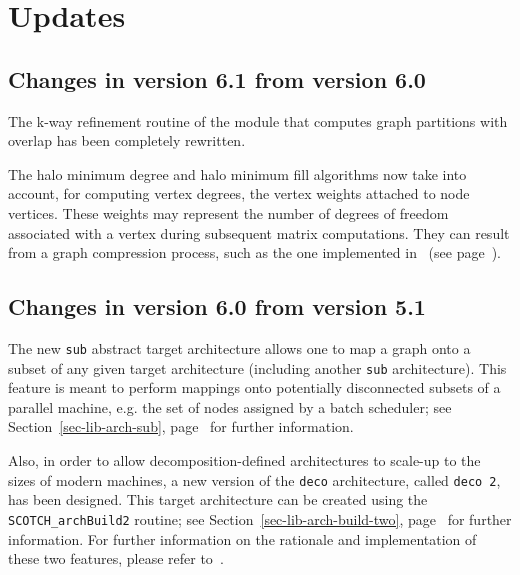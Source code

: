
\section{Updates}
\label{sec-changes}

\subsection{Changes in version 6.1 from version 6.0}

The k-way refinement routine of the module that computes graph
partitions with overlap has been completely rewritten.

The halo minimum degree and halo minimum fill algorithms now take into
account, for computing vertex degrees, the vertex weights attached to
node vertices. These weights may represent the number of degrees of
freedom associated with a vertex during subsequent matrix
computations. They can result from a graph compression process, such
as the one implemented in \scotch\ (see
page~\pageref{sec-lib-meth-compress}).

\subsection{Changes in version 6.0 from version 5.1}

The new \texttt{sub} abstract target architecture allows one to map a
graph onto a subset of any given target architecture (including
another \texttt{sub} architecture). This feature is meant to perform
mappings onto potentially disconnected subsets of a parallel machine,
e.g. the set of nodes assigned by a batch scheduler; see
Section~\ref{sec-lib-arch-sub}, page~\pageref{sec-lib-arch-sub} for
further information.

Also, in order to allow decomposition-defined architectures to
scale-up to the sizes of modern machines, a new version of the
\texttt{deco} architecture, called \texttt{deco~2}, has been
designed. This target architecture can be created using the 
\texttt{SCOTCH\_\lbt arch\lbt Build2} routine; see
Section~\ref{sec-lib-arch-build-two},
page~\pageref{sec-lib-arch-build-two} for further information.
For further information on the rationale and implementation of these
two features, please refer to~\cite{pellegrini:hal-01671156}.

